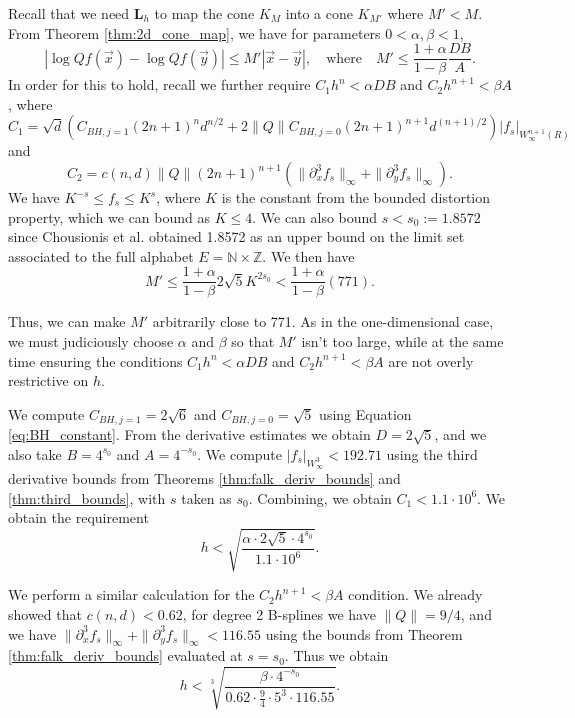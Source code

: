 \documentclass[10pt]{article}
\theoremstyle{definition}
\numberwithin{equation}{section}
\numberwithin{figure}{section}
\numberwithin{table}{section}
\begin{document}
Recall that we need $\mathbf{L}_h$ to map the cone $K_M$ into a cone $K_{M'}$ where $M'<M$. From Theorem \ref{thm:2d_cone_map}, we have for parameters $0<\alpha,\beta<1$,
$$|\log Qf(\vec x)-\log Qf(\vec y)|\leq M'|\vec{x}-\vec{y}|,\quad \text{where}\quad M'\leq \frac{1+\alpha}{1-\beta}\frac{DB}{A}.$$
In order for this to hold, recall we further require $C_1h^n<\alpha DB$ and $C_2h^{n+1}<\beta A$, where
$$C_1=\sqrt{d}(C_{BH,j=1}(2n+1)^nd^{n/2}+2\|Q\|C_{BH,j=0}(2n+1)^{n+1}d^{(n+1)/2})|f_s|_{W^{n+1}_\infty(R)}$$
and 
$$C_2=c(n,d)\|Q\|(2n+1)^{n+1}(\|\partial^3_xf_s\|_\infty+\|\partial^3_yf_s\|_\infty).$$
We have $K^{-s}\leq f_s\leq K^s$, where $K$ is the constant from the bounded distortion property, which we can bound as $K\leq 4$. We can also bound $s<s_0:=1.8572$ since Chousionis et al. \cite{chousionis2024rigorous} obtained 1.8572 as an upper bound on the limit set associated to the full alphabet $E=\mathbb{N}\times\mathbb{Z}$. We then have
$$M'\leq\frac{1+\alpha}{1-\beta}2\sqrt{5}K^{2s_0}<\frac{1+\alpha}{1-\beta}(771).$$

Thus, we can make $M'$ arbitrarily close to 771. As in the one-dimensional case, we must judiciously choose $\alpha$ and $\beta$ so that $M'$ isn't too large, while at the same time ensuring the conditions $C_1h^n<\alpha DB$ and $C_2h^{n+1}<\beta A$ are not overly restrictive on $h$.

We compute $C_{BH,j=1}=2\sqrt6$ and $C_{BH,j=0}=\sqrt5$ using Equation \ref{eq:BH_constant}. From the derivative estimates we obtain $D=2\sqrt5$, and we also take $B=4^{s_0}$ and $A=4^{-s_0}$. We compute $|f_s|_{W^3_\infty}<192.71$ using the third derivative bounds from Theorems \ref{thm:falk_deriv_bounds} and \ref{thm:third_bounds}, with $s$ taken as $s_0$. Combining, we obtain $C_1<1.1\cdot 10^6$. We obtain the requirement
\begin{equation}
h<\sqrt{\frac{\alpha\cdot2\sqrt5\cdot4^{s_0}}{1.1\cdot10^6}}.
\label{eq:alpha_req_2d}
\end{equation}

We perform a similar calculation for the $C_2h^{n+1}<\beta A$ condition. We already showed that $c(n,d)<0.62$, for degree 2 B-splines we have $\|Q\|=9/4$, and we have $\|\partial^3_xf_s\|_\infty+\|\partial^3_yf_s\|_\infty<116.55$ using the bounds from Theorem \ref{thm:falk_deriv_bounds} evaluated at $s=s_0$. Thus we obtain 
\begin{equation}
h<\sqrt[3]{\frac{\beta\cdot4^{-s_0}}{0.62\cdot\frac94\cdot5^3\cdot116.55}}.
\label{eq:beta_req_2d}
\end{equation}
\end{document}

